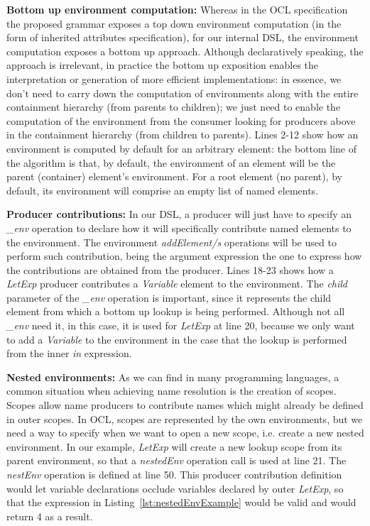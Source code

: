 \documentclass{llncs}
\begin{document}
\textbf{Bottom up environment computation:} Whereas in the OCL specification the proposed grammar exposes a top down environment computation (in the form of inherited attributes specification), for our internal DSL, the environment computation exposes a bottom up approach. Although declaratively speaking, the approach is irrelevant, in practice the bottom up exposition enables the interpretation or generation of more efficient implementations: in essence, we don't need to carry down the computation of environments along with the entire containment hierarchy (from parents to children); we just need to enable the computation of the environment from the consumer looking for producers above in the containment hierarchy (from children to parents). Lines 2-12 show how an environment is computed by default for an arbitrary element: the bottom line of the algorithm is that, by default, the environment of an element will be the parent (container) element's environment. For a root element (no parent), by default, its environment will comprise an empty list of named elements. 

\textbf{Producer contributions:} In our DSL, a producer will just have to specify an \emph{\_env} operation to declare how it will specifically contribute named elements to the environment. The environment \emph{addElement/s} operations will be used to perform such contribution, being the argument expression the one to express how the contributions are obtained from the producer. Lines 18-23 shows how a \emph{LetExp} producer contributes a \emph{Variable} element to the environment. The \emph{child} parameter of the \emph{\_env} operation is important, since it represents the child element from which a bottom up lookup is being performed. Although not all \emph{\_env} need it, in this case, it is used for \emph{LetExp} at line 20, because we only want to add a \emph{Variable} to the environment in the case that the lookup is performed from the inner \emph{in} expression.

\textbf{Nested environments:} As we can find in many programming languages, a common situation when achieving name resolution is the creation of scopes. Scopes allow name producers to contribute names which might already be defined in outer scopes. In OCL, scopes are represented by the own environments, but we need a way to specify when we want to open a new scope, i.e. create a new nested environment. In our example, \emph{LetExp}  will create a new lookup scope from its parent environment, so that a \emph{nestedEnv} operation call is used at line 21. The \emph{nestEnv} operation is defined at line 50. This producer contribution definition would let variable declarations occlude variables declared by outer \emph{LetExp}, so that the expression in Listing~\ref{lst:nestedEnvExample} would be valid and would return 4 as a result.
\end{document}
